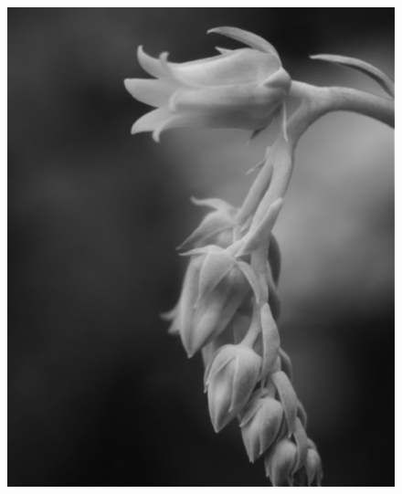 \documentclass[11pt]{article}
\begin{document}
\begin{figure}[h]
        \includegraphics[scale=0.31]{Exercise1_OutputImage.png}
    \end{figure}
\end{document}
